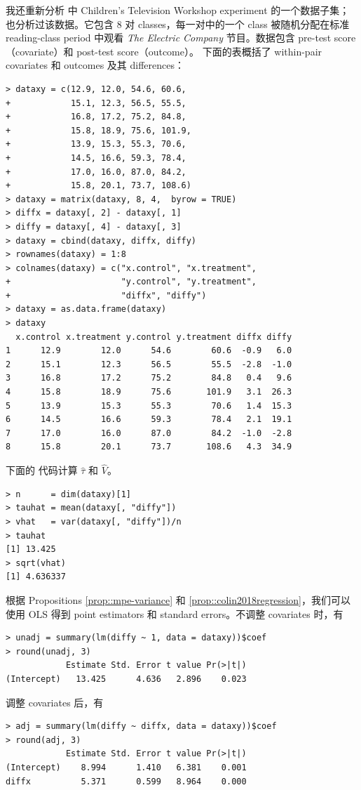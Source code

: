 我还重新分析 \citet{ball1973reading} 中 Children's Television Workshop experiment 的一个数据子集；\citet[][Chapter 10]{imbens2015causal} 也分析过该数据。它包含 8 对 classes，每一对中的一个 class 被随机分配在标准 reading-class period 中观看 {\it The Electric Company} 节目。数据包含 pre-test score（covariate）和 post-test score（outcome）。
下面的表概括了 within-pair covariates 和 outcomes 及其 differences：
\begin{lstlisting}
> dataxy = c(12.9, 12.0, 54.6, 60.6,
+            15.1, 12.3, 56.5, 55.5,
+            16.8, 17.2, 75.2, 84.8,
+            15.8, 18.9, 75.6, 101.9,
+            13.9, 15.3, 55.3, 70.6,
+            14.5, 16.6, 59.3, 78.4,
+            17.0, 16.0, 87.0, 84.2,
+            15.8, 20.1, 73.7, 108.6)
> dataxy = matrix(dataxy, 8, 4,  byrow = TRUE)           
> diffx = dataxy[, 2] - dataxy[, 1]
> diffy = dataxy[, 4] - dataxy[, 3]
> dataxy = cbind(dataxy, diffx, diffy)
> rownames(dataxy) = 1:8
> colnames(dataxy) = c("x.control", "x.treatment", 
+                      "y.control", "y.treatment",
+                      "diffx", "diffy")
> dataxy = as.data.frame(dataxy)
> dataxy
  x.control x.treatment y.control y.treatment diffx diffy
1      12.9        12.0      54.6        60.6  -0.9   6.0
2      15.1        12.3      56.5        55.5  -2.8  -1.0
3      16.8        17.2      75.2        84.8   0.4   9.6
4      15.8        18.9      75.6       101.9   3.1  26.3
5      13.9        15.3      55.3        70.6   1.4  15.3
6      14.5        16.6      59.3        78.4   2.1  19.1
7      17.0        16.0      87.0        84.2  -1.0  -2.8
8      15.8        20.1      73.7       108.6   4.3  34.9
\end{lstlisting}


下面的  代码计算 $\hat\tau$ 和 $\hat V$。
\begin{lstlisting}
> n      = dim(dataxy)[1]
> tauhat = mean(dataxy[, "diffy"])
> vhat   = var(dataxy[, "diffy"])/n
> tauhat
[1] 13.425
> sqrt(vhat)
[1] 4.636337
\end{lstlisting}
根据 Propositions \ref{prop::mpe-variance} 和 \ref{prop::colin2018regression}，我们可以使用 OLS 得到 point estimators 和 standard errors。不调整 covariates 时，有
\begin{lstlisting}
> unadj = summary(lm(diffy ~ 1, data = dataxy))$coef
> round(unadj, 3) 
            Estimate Std. Error t value Pr(>|t|)
(Intercept)   13.425      4.636   2.896    0.023
\end{lstlisting}
调整 covariates 后，有
\begin{lstlisting} 
> adj = summary(lm(diffy ~ diffx, data = dataxy))$coef
> round(adj, 3)
            Estimate Std. Error t value Pr(>|t|)
(Intercept)    8.994      1.410   6.381    0.001
diffx          5.371      0.599   8.964    0.000
\end{lstlisting}


